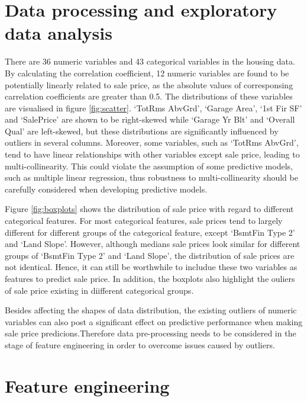 \documentclass[letterpaper,12pt,twoside,]{pinp}
\begin{document}
\hypertarget{data-processing-and-exploratory-data-analysis}{%
\section{Data processing and exploratory data
analysis}\label{data-processing-and-exploratory-data-analysis}}

There are 36 numeric variables and 43 categorical variables in the
housing data. By calculating the correlation coefficient, 12 numeric
variables are found to be potentially linearly related to sale price, as
the absolute values of corresponsing carrelation coefficients are
greater than 0.5. The distributions of these variables are visualised in
figure \ref{fig:scatter}. `TotRms AbvGrd', `Garage Area', `1st Fir SF'
and `SalePrice' are shown to be right-skewed while `Garage Yr Blt' and
`Overall Qual' are left-skewed, but these distributions are
significantly influenced by outliers in several columns. Moreover, some
variables, such as `TotRms AbvGrd', tend to have linear relationships
with other variables except sale price, leading to multi-collinearity.
This could violate the assumption of some predictive models, such as
multiple linear regression, thus robustness to multi-collinearity should
be carefully considered when developing predictive models.

Figure \ref{fig:boxplots} shows the distribution of sale price with
regard to different categorical features. For most categorical features,
sale prices tend to largely different for different groups of the
categorical feature, except `BsmtFin Type 2' and `Land Slope'. However,
although medians sale prices look similar for different groups of
`BsmtFin Type 2' and `Land Slope', the distribution of sale prices are
not identical. Hence, it can still be worthwhile to includue these two
variables as features to predict sale price. In addition, the boxplots
also highlight the ouliers of sale price existing in diifferent
categorical groups.

Besides affecting the shapes of data distribution, the existing outliers
of numeric variables can also post a significant effect on predictive
performance when making sale price predicions.Therefore data
pre-processing needs to be considered in the stage of feature
engineering in order to overcome issues caused by outliers.

\hypertarget{feature-engineering}{%
\section{Feature engineering}\label{feature-engineering}}
\end{document}
